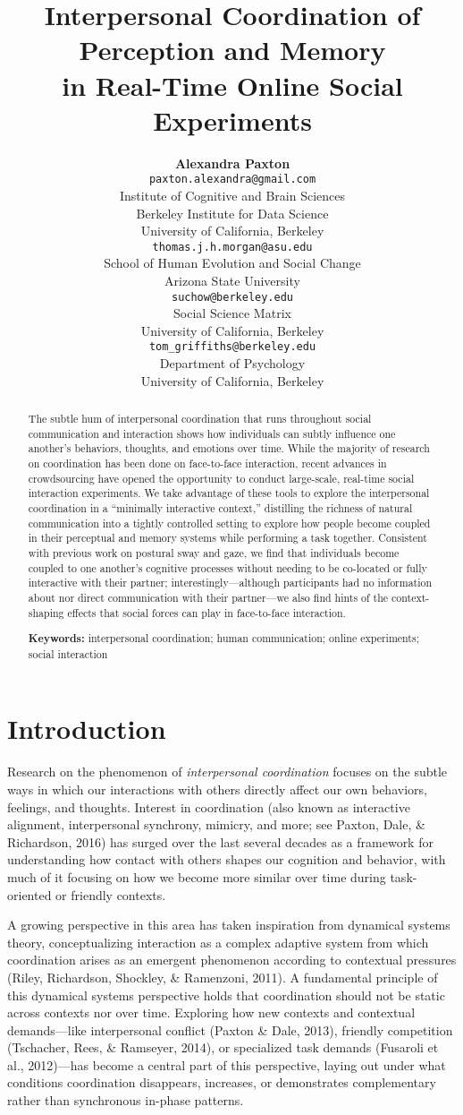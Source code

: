 \documentclass[10pt, letterpaper]{article}
\title{Interpersonal Coordination of Perception and Memory \\in Real-Time Online
Social Experiments}
\author{{\large \bf Alexandra Paxton} \\ \texttt{paxton.alexandra@gmail.com} \\ Institute of Cognitive and Brain Sciences \\ Berkeley Institute for Data Science \\ University of California, Berkeley \And {\large \bf Thomas J. H. Morgan} \\ \texttt{thomas.j.h.morgan@asu.edu} \\ School of Human Evolution and Social Change \\ Arizona State University \AND {\large \bf Jordan W. Suchow} \\ \texttt{suchow@berkeley.edu} \\ Social Science Matrix \\ University of California, Berkeley \And {\large \bf Thomas L. Griffiths} \\ \texttt{tom\_griffiths@berkeley.edu} \\ Department of Psychology \\ University of California, Berkeley}
\begin{document}
\maketitle

\begin{abstract}
The subtle hum of interpersonal coordination that runs throughout social
communication and interaction shows how individuals can subtly influence
one another's behaviors, thoughts, and emotions over time. While the
majority of research on coordination has been done on face-to-face
interaction, recent advances in crowdsourcing have opened the
opportunity to conduct large-scale, real-time social interaction
experiments. We take advantage of these tools to explore the
interpersonal coordination in a ``minimally interactive context,''
distilling the richness of natural communication into a tightly
controlled setting to explore how people become coupled in their
perceptual and memory systems while performing a task together.
Consistent with previous work on postural sway and gaze, we find that
individuals become coupled to one another's cognitive processes without
needing to be co-located or fully interactive with their partner;
interestingly---although participants had no information about nor
direct communication with their partner---we also find hints of the
context-shaping effects that social forces can play in face-to-face
interaction.

\textbf{Keywords:}
interpersonal coordination; human communication; online experiments;
social interaction
\end{abstract}

\section{Introduction}\label{introduction}

Research on the phenomenon of \emph{interpersonal coordination} focuses
on the subtle ways in which our interactions with others directly affect
our own behaviors, feelings, and thoughts. Interest in coordination
(also known as interactive alignment, interpersonal synchrony, mimicry,
and more; see Paxton, Dale, \& Richardson, 2016) has surged over the
last several decades as a framework for understanding how contact with
others shapes our cognition and behavior, with much of it focusing on
how we become more similar over time during task-oriented or friendly
contexts.

A growing perspective in this area has taken inspiration from dynamical
systems theory, conceptualizing interaction as a complex adaptive system
from which coordination arises as an emergent phenomenon according to
contextual pressures (Riley, Richardson, Shockley, \& Ramenzoni, 2011).
A fundamental principle of this dynamical systems perspective holds that
coordination should not be static across contexts nor over time.
Exploring how new contexts and contextual demands---like interpersonal
conflict (Paxton \& Dale, 2013), friendly competition (Tschacher, Rees,
\& Ramseyer, 2014), or specialized task demands (Fusaroli et al.,
2012)---has become a central part of this perspective, laying out under
what conditions coordination disappears, increases, or demonstrates
complementary rather than synchronous in-phase patterns.
\end{document}
